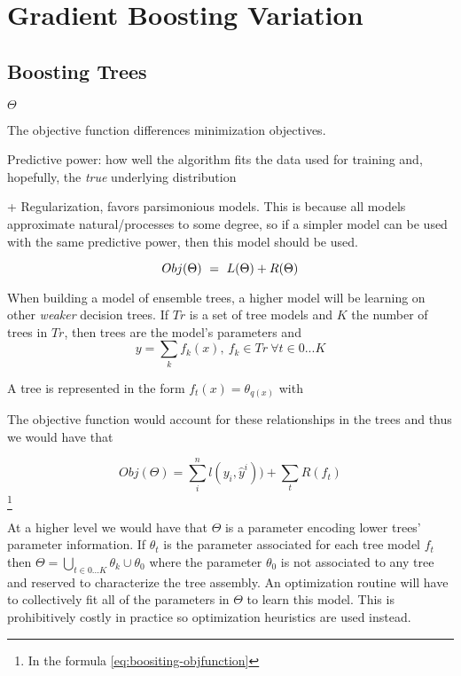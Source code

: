 \section{Gradient Boosting Variation}

\subsection{Boosting Trees    }

$\Theta$

The objective function differences minimization objectives. 

Predictive power: how well the algorithm fits the data used for training and, hopefully, the \textit{true} underlying distribution

+ Regularization, favors parsimonious models. This is because all models approximate natural/processes to some degree, so if a simpler model can be used with the same predictive power, then this model should be used.  

\begin{equation} \label{eq:objFunction}
Obj(\Theta) \ = \ L(\Theta) + R(\Theta)
\\
\end{equation}

When building a model of ensemble trees, a higher model will be learning on other \textit{weaker} decision trees. If $Tr$ is a set of tree models and $K$ the number of trees in $Tr$, then trees are the model's parameters and
\[ y = \sum_k f_k(x) , \ f_k \in Tr \ \forall t \in {0...K}\]

A tree is represented in the form $f_t(x) = \theta_{q(x)}$  with ${}$

The objective function would account for these relationships in the trees and thus we would have that
 
\[ Obj(\Theta) = \sum_i^n l(y_i,\hat{y}^i))  +  \sum_t R(f_t) \] \label{eq:boositing-objfunction} \footnote{In the formula \ref{eq:boositing-objfunction} }
%    

At a higher level we would have that $\Theta$ is a parameter encoding lower trees' parameter information. If $\theta_t$ is the parameter associated for each tree model $f_t$ then $\Theta =  \bigcup_{t \in {0...K}} \theta_k  \cup \theta_0$ where the parameter $\theta_0$ is not associated to any tree and reserved to characterize the tree assembly. An optimization routine will have to collectively fit all of the parameters in $\Theta$ to learn this model. This is prohibitively costly in practice so optimization heuristics are used instead. 

